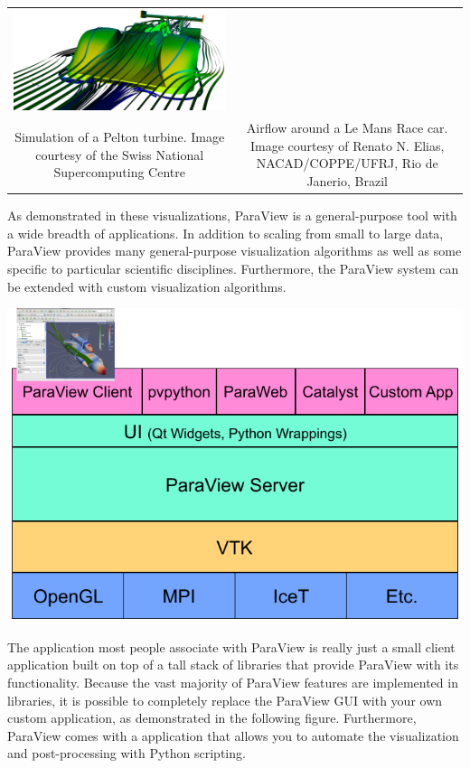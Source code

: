 \begin{inlinefig}
\begin{tabular}{cc}
    \includegraphics[width=.61\linewidth]{images/LeMansCar} \\
    \parbox[t]{.29\linewidth}{\footnotesize Simulation of a Pelton turbine.
      Image courtesy of the Swiss National Supercomputing Centre} &
    \parbox[t]{.61\linewidth}{\footnotesize Airflow around a Le Mans Race
      car.  Image courtesy of Renato N. Elias, NACAD/COPPE/UFRJ, Rio de
      Janerio, Brazil}
  \end{tabular}
\end{inlinefig}

As demonstrated in these visualizations, ParaView is a general-purpose tool
with a wide breadth of applications.  In addition to scaling from small to
large data, ParaView provides many general-purpose visualization algorithms
as well as some specific to particular scientific disciplines.
Furthermore, the ParaView system can be extended with custom visualization
algorithms.

\begin{inlinefig}
  \includegraphics[scale=\bbscale]{images/ParaViewLibStack}
\end{inlinefig}

The application most people associate with ParaView is really just a small
client application built on top of a tall stack of libraries that provide
ParaView with its functionality.  Because the vast majority of ParaView
features are implemented in libraries, it is possible to completely replace
the ParaView GUI with your own custom application, as demonstrated in the
following figure.  Furthermore, ParaView comes with a 
application that allows you to automate the visualization and
post-processing with Python scripting.

